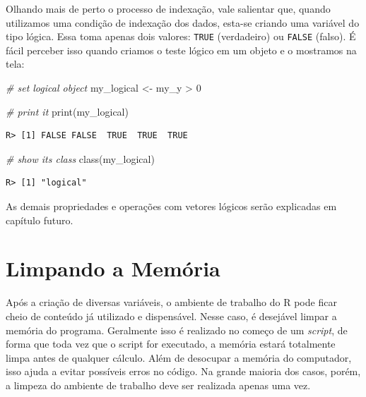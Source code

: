 \documentclass[
  11pt,
]{book}
\newenvironment{Shaded}{\begin{snugshade}}{\end{snugshade}}
\newcommand{\CommentTok}[1]{\textcolor[rgb]{0.37,0.37,0.37}{\textit{#1}}}
\newcommand{\DecValTok}[1]{\textcolor[rgb]{0.06,0.06,0.06}{#1}}
\newcommand{\FunctionTok}[1]{\textcolor[rgb]{0,0,0}{#1}}
\newcommand{\NormalTok}[1]{#1}
\newcommand{\OtherTok}[1]{\textcolor[rgb]{0.37,0.37,0.37}{#1}}
\newcommand{\SpecialCharTok}[1]{\textcolor[rgb]{0,0,0}{#1}}
\begin{document}
Olhando mais de perto o processo de indexação, vale salientar que, quando utilizamos uma condição de indexação dos dados, esta-se criando uma variável do tipo lógica. Essa toma apenas dois valores: \texttt{TRUE} (verdadeiro) ou \texttt{FALSE} (falso). É fácil perceber isso quando criamos o teste lógico em um objeto e o mostramos na tela:

\begin{Shaded}
\begin{Highlighting}[]
\CommentTok{\# set logical object}
\NormalTok{my\_logical }\OtherTok{\textless{}{-}}\NormalTok{ my\_y }\SpecialCharTok{\textgreater{}} \DecValTok{0}

\CommentTok{\# print it}
\FunctionTok{print}\NormalTok{(my\_logical)}
\end{Highlighting}
\end{Shaded}

\begin{verbatim}
R> [1] FALSE FALSE  TRUE  TRUE  TRUE
\end{verbatim}

\begin{Shaded}
\begin{Highlighting}[]
\CommentTok{\# show its class}
\FunctionTok{class}\NormalTok{(my\_logical)}
\end{Highlighting}
\end{Shaded}

\begin{verbatim}
R> [1] "logical"
\end{verbatim}

As demais propriedades e operações com vetores lógicos serão explicadas em capítulo futuro.

\hypertarget{limpando-a-memuxf3ria}{%
\section{Limpando a Memória}\label{limpando-a-memuxf3ria}}

Após a criação de diversas variáveis, o ambiente de trabalho do R pode ficar cheio de conteúdo já utilizado e dispensável. Nesse caso, é desejável limpar a memória do programa. Geralmente isso é realizado no começo de um \emph{script}, de forma que toda vez que o script for executado, a memória estará totalmente limpa antes de qualquer cálculo. Além de desocupar a memória do computador, isso ajuda a evitar possíveis erros no código. Na grande maioria dos casos, porém, a limpeza do ambiente de trabalho deve ser realizada apenas uma vez.
\end{document}
